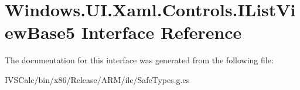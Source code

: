 \hypertarget{interface_windows_1_1_u_i_1_1_xaml_1_1_controls_1_1_i_list_view_base5}{}\section{Windows.\+U\+I.\+Xaml.\+Controls.\+I\+List\+View\+Base5 Interface Reference}
\label{interface_windows_1_1_u_i_1_1_xaml_1_1_controls_1_1_i_list_view_base5}


The documentation for this interface was generated from the following file\+:\begin{DoxyCompactItemize}
\item 
I\+V\+S\+Calc/bin/x86/\+Release/\+A\+R\+M/ilc/Safe\+Types.\+g.\+cs\end{DoxyCompactItemize}
